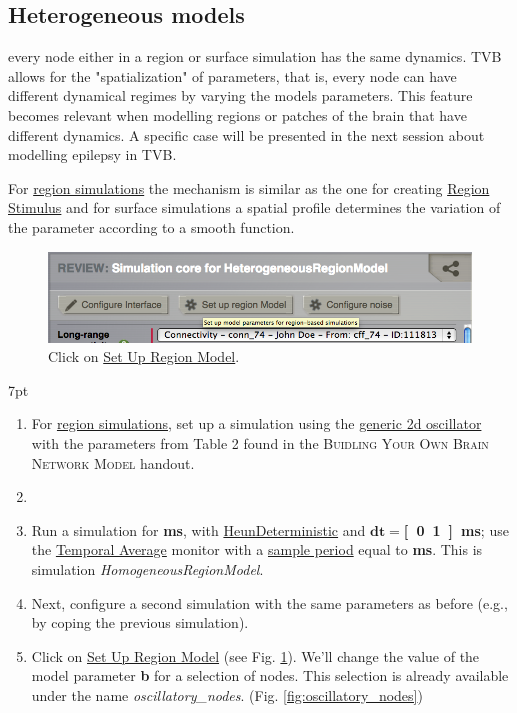\documentclass{tufte-handout}
\newenvironment{simulation}{%
  \def\FrameCommand{%
    \hspace{1pt}%
    {\color{ForestGreen}\vrule width 2pt}%
    {\color{simulationshade}\vrule width 4pt}%
    \colorbox{simulationshade}%
  }%
  \MakeFramed{\advance\hsize-\width\FrameRestore}%
  \noindent\hspace{-4.55pt}%
  \begin{adjustwidth}{}{7pt}%
  \vspace{2pt}\vspace{2pt}%
}
{%
  \vspace{2pt}\end{adjustwidth}\endMakeFramed%
}
\begin{document}
\subsection{Heterogeneous models}\label{sec:spatialization}

 every node either in a region or surface
simulation has the same dynamics. TVB allows for the "spatialization" of
parameters, that is, every node can have different dynamical regimes by
varying the models parameters. This feature becomes relevant when modelling
regions or patches of the brain that have different dynamics. A specific case
will be presented in the next session about modelling epilepsy in TVB.

For \underline{region simulations} the mechanism is similar as the one for creating \underline{Region
Stimulus} and for surface simulations a spatial profile determines the
variation of the parameter according to a smooth function.

\begin{figure}[h]
  \includegraphics[width=\linewidth]{Handout_UI_HeterogenousModelAndStimulation_SetUpRegionModel.png}%
  \caption{Click on \underline{Set Up Region Model}.}%
  \label{fig:setup_regionmodel}%
\end{figure}

\begin{simulation}
\begin{enumerate}
\item For \underline{region simulations}, set up a simulation using the \underline{generic 2d oscillator} with the parameters from Table 2  found in the \textsc{Buidling Your Own Brain Network Model} handout. 
\item \item Run a simulation for \textbf{\unit[1000]{ms}}, with \underline{HeunDeterministic} and $\mathbf{dt=}$\textbf{\unit[0.1]{ms}}; use the \underline{Temporal Average} monitor with a \underline{sample period} equal to \textbf{\unit[1]{ms}}.  This is simulation \textit{HomogeneousRegionModel}.
\item Next, configure a second simulation with the same parameters as before (e.g., by coping the previous simulation). 
\item Click on \underline{Set Up Region Model} (see Fig. \ref{fig:setup_regionmodel}). We'll change the value of the model parameter \textbf{b} for a selection of nodes. This selection is already available under the name \textit{oscillatory\_nodes}. (Fig. \ref{fig:oscillatory_nodes})
\end{enumerate}
\end{simulation}
\end{document}

